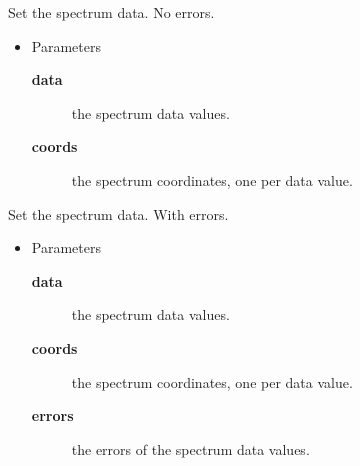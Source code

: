 \begin{desc}Set the spectrum data. No errors.
\begin{itemize}
\item{Parameters
  \begin{description}
   \item[\textbf{data}]{the spectrum data values.}
   \item[\textbf{coords}]{the spectrum coordinates, one per data value.}
  \end{description}}
\end{itemize}
\end{desc}

\begin{desc}Set the spectrum data. With errors.
\begin{itemize}
\item{Parameters
  \begin{description}
   \item[\textbf{data}]{the spectrum data values.}
   \item[\textbf{coords}]{the spectrum coordinates, one per data value.}
   \item[\textbf{errors}]{the errors of the spectrum data values.}
  \end{description}}
\end{itemize}
\end{desc}





\vspace{.09in}



